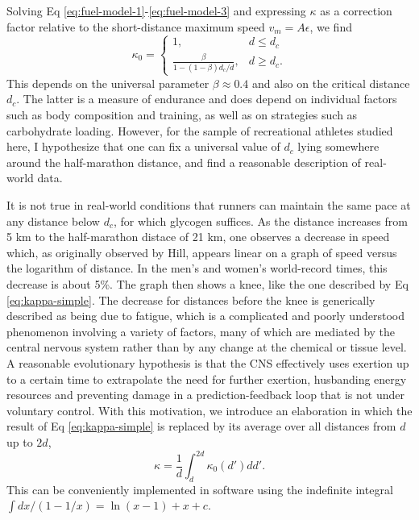 \documentclass[10pt,letterpaper]{article}
\begin{document}
Solving Eq \ref{eq:fuel-model-1}-\ref{eq:fuel-model-3} and expressing $\kappa$ as a correction factor
relative to the short-distance maximum speed $v_m=A\epsilon$, we find
\begin{equation}\label{eq:kappa-simple}
  \kappa_0 = \begin{cases}
    1, & d\le d_c \\
    \frac{\beta}{1-(1-\beta)d_c/d}, & d\ge d_c.
  \end{cases}
\end{equation}
This depends on the universal parameter $\beta\approx0.4$ and also on the critical distance $d_c$.
The latter is a measure of endurance and does depend on individual factors such as
body composition and training, as well as on strategies such as carbohydrate loading.
However, for the sample of recreational athletes studied here, I hypothesize that one can fix a universal value of $d_c$ lying somewhere
around the half-marathon distance, and find a reasonable description of
real-world data.

It is not true in real-world conditions that runners can maintain the same pace at any distance below
$d_c$, for which glycogen suffices. As the distance increases from 5 km to the half-marathon
distace of 21 km, one observes a decrease in speed which, as originally observed by Hill,\cite{hill} appears
linear on a graph of speed versus the logarithm of distance. In the men's and women's world-record
times, this decrease is about 5\%. The graph then shows a knee, like the one described by Eq \ref{eq:kappa-simple}.
The decrease for distances before the knee is generically described as being due to fatigue, which is
a complicated and poorly understood phenomenon involving a variety of factors, many of which are mediated
by the central nervous system rather than by any change at the chemical or tissue level. A reasonable
evolutionary hypothesis is that the CNS effectively uses exertion up to a certain time to extrapolate
the need for further exertion, husbanding energy resources and preventing damage in a prediction-feedback
loop that is not under voluntary control. With this motivation, we introduce an elaboration 
in which the result of Eq \ref{eq:kappa-simple} is replaced by its average over all distances from
$d$ up to $2d$,
\begin{equation}\label{eq:kappa}
  \kappa = \frac{1}{d}\int_d^{2d} \kappa_0(d') dd'.
\end{equation}
This can be conveniently implemented in software using the indefinite integral $\int dx/(1-1/x)=\ln(x-1)+x+c$.
\end{document}
